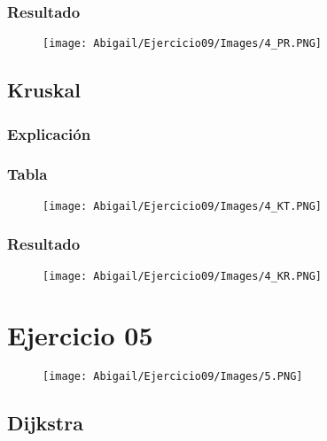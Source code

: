 \documentclass[12pt]{article}
\begin{document}
      \subsubsection{Resultado}
        \begin{figure}[h!]
          \centering
          \texttt{[image: Abigail/Ejercicio09/Images/4\_PR.PNG]}
        \end{figure} 

    \subsection{Kruskal}

      \subsubsection{Explicación}

      \subsubsection{Tabla}
      \begin{figure}[h!]
          \centering
          \texttt{[image: Abigail/Ejercicio09/Images/4\_KT.PNG]}
        \end{figure} 

      \subsubsection{Resultado}

        \begin{figure}[h!]
          \centering
          \texttt{[image: Abigail/Ejercicio09/Images/4\_KR.PNG]}
        \end{figure} 

  
  \section{Ejercicio 05}

    \begin{figure}[h!]
      \centering
      \texttt{[image: Abigail/Ejercicio09/Images/5.PNG]}
    \end{figure} 

    \subsection{Dijkstra}
\end{document}
